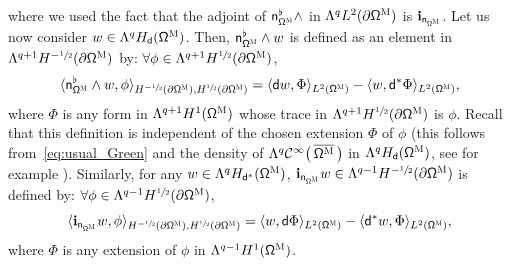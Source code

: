 \documentclass[10pt]{amsart}
\let\pa\partial
\theoremstyle{plain}
\theoremstyle{definition}
\begin{document}
where we used the fact that the adjoint of $\mathsf n_{\mathsf \Omega^{\textsc{M}}}^\flat\wedge$ in $\Lambda^qL^2 (\pa \mathsf \Omega^{\textsc{M}})$ is $\mathbf i_{\mathsf n_{\mathsf \Omega^{\textsc{M}}}}$. Let us now consider $w \in \Lambda^q
H_{\mathsf d} (\mathsf \Omega^{\textsc{M}})$. Then, $\mathsf
n_{\mathsf \Omega^{\textsc{M}}}^\flat \wedge w$ is defined as an
element in $ \Lambda^{q+1} H^{-\sfrac12} (\pa\mathsf
\Omega^{\textsc{M}})$ by: $\forall \phi \in\Lambda^{q+1}H^{\sfrac12}
(\pa\mathsf \Omega^{\textsc{M}})$,
\begin{equation}
\label{eq.n-wedge-u}
\langle \mathsf n_{\mathsf \Omega^{\textsc{M}}}^\flat \wedge w, \phi \rangle_{H^{-\sfrac12} (\pa\mathsf \Omega^{\textsc{M}}),H^{\sfrac12} (\pa\mathsf \Omega^{\textsc{M}})} =
\langle \mathsf d w, \Phi \rangle_{ L^2 (\mathsf \Omega^{\textsc{M}})}-\langle w, \mathsf d^*\Phi\rangle_{ L^2 (\mathsf \Omega^{\textsc{M}})},
\end{equation}
where $\Phi$ is any form in $\Lambda^{q+1}H^{1} (\mathsf \Omega^{\textsc{M}})$ whose trace
in $\Lambda^{q+1}H^{\sfrac12} (\pa\mathsf \Omega^{\textsc{M}})$ is $\phi$. Recall that this definition is independent of the chosen extension $\Phi$ of $\phi$ (this follows from~\eqref{eq:usual_Green} and the density of $\Lambda^q\mathcal C^\infty\bigl(\, \overline{\mathsf \Omega^{\textsc{M}}}\, \bigr)$
in $\Lambda^q H_{\mathsf d} (\mathsf \Omega^{\textsc{M}})$, see
for example
\cite[Prop.\,3.1]{jakab-mitrea-mitrea-09}). Similarly, for any
$w \in \Lambda^q H_{\mathsf d^*} (\mathsf \Omega^{\textsc{M}})$,
$\mathbf{i}_{\mathsf n_{\mathsf \Omega^{\textsc{M}}}} w\in
\Lambda^{q-1}H^{-\sfrac12} (\pa\mathsf \Omega^{\textsc{M}})$
is defined by: $\forall \phi \in \Lambda^{q-1} H^{\sfrac12} (\pa\mathsf \Omega^{\textsc{M}})$,
\begin{equation}
\label{eq.i-n-u}
\langle \mathbf{i}_{\mathsf n_{\mathsf \Omega^{\textsc{M}}}} w, \phi \rangle_{H^{-\sfrac12} (\pa\mathsf \Omega^{\textsc{M}}),H^{\sfrac12} (\pa\mathsf \Omega^{\textsc{M}})} =
\langle w, \mathsf d\Phi\rangle_{ L^2 (\mathsf \Omega^{\textsc{M}})}-\langle \mathsf d^*w, \Phi\rangle_{ L^2 (\mathsf \Omega^{\textsc{M}})},
\end{equation}
where $\Phi$ is any extension of $\phi$ in $\Lambda^{q-1}H^{1} (\mathsf \Omega^{\textsc{M}})$.
\end{document}
